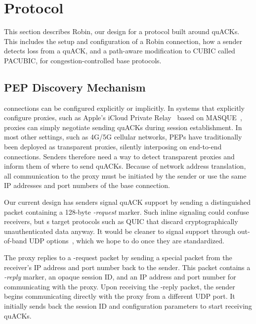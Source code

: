 \section{\Sys Protocol}
\label{sec:design}

This section describes Robin, our design for a \sys protocol built
around quACKs. This includes the setup and configuration of a Robin
\sys connection, how a sender detects loss from a quACK, and a path-aware
modification to CUBIC called PACUBIC, for congestion-controlled base protocols.

\subsection{PEP Discovery Mechanism}

\Sys connections can be configured explicitly or implicitly.  In systems that
explicitly configure proxies, such as Apple's iCloud Private Relay~\cite{icloud-private-relay}
based on MASQUE~\cite{kosek2021masque,kramer2021masquepep}, proxies can simply negotiate
sending quACKs during session establishment.  In most other settings,
such as 4G/5G cellular networks, PEPs have traditionally been deployed
as transparent proxies, silently interposing on end-to-end
connections.  Senders therefore need a way to detect transparent \sys
proxies and inform them of where to send quACKs.  Because of network
address translation, all communication to the proxy must be initiated
by the sender or use the same IP addresses and port numbers of the
base connection.

Our current design has senders signal quACK support by sending a
distinguished packet containing a 128-byte \emph{\sys-request} marker.  Such
inline signaling could confuse receivers, but {\sys}s target
protocols such as QUIC that discard cryptographically unauthenticated
data anyway.  It would be cleaner to signal support through
out-of-band UDP options~\cite{ietf-tsvwg-udp-options-28}, which we hope to do
once they are standardized.

The proxy replies to a \sys-request packet by sending a special packet
from the receiver's IP address and port number back to the sender.
This packet contains a \emph{\sys-reply} marker, an opaque session ID, and an
IP address and port number for communicating with the proxy.  Upon
receiving the \sys-reply packet, the sender begins communicating
directly with the proxy from a different UDP port.  It initially sends
back the session ID and configuration parameters to start receiving
quACKs.

